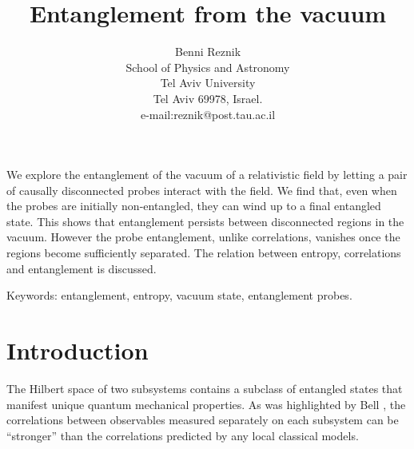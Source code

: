 \documentclass[12pt]{article}
\begin{document}
\title{  Entanglement from the vacuum}

\author{
          Benni Reznik \\
          School of Physics and Astronomy \\
          Tel Aviv University \\
          Tel Aviv 69978, Israel.\\
e-mail:reznik@post.tau.ac.il
}
\maketitle


We explore the entanglement of the vacuum of a relativistic field
by letting a pair of  causally disconnected probes
interact with the field.
We find that, even when the probes are initially non-entangled,
they can wind up to a final entangled state.
This shows that entanglement persists between disconnected
regions in the
vacuum.
However the probe entanglement, unlike correlations,
vanishes once the regions become sufficiently separated.
The relation between entropy, correlations and entanglement is
discussed.

Keywords: entanglement, entropy,
vacuum state, entanglement probes.






\section{\bf Introduction }



The Hilbert space of two subsystems contains a
subclass of entangled states that manifest unique
quantum mechanical properties.
As was highlighted by Bell \cite{bell},
the correlations between observables measured separately
on each subsystem can be ``stronger''  than
the correlations predicted by any local classical models.
\end{document}
